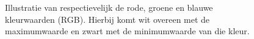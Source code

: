 \documentclass[a4paper,kulak]{kulakarticle}
\begin{document}
\begin{figure}[H]
	\centering
	\qquad
	\qquad
	
	\caption{Illustratie van respectievelijk de rode, groene en blauwe kleurwaarden (RGB). Hierbij komt wit overeen met de maximumwaarde en zwart met de minimumwaarde van die kleur.}
	\label{figuur RGB}
\end{figure}
\end{document}
